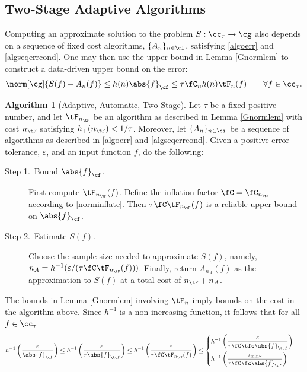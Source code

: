 \documentclass[]{elsarticle}
\theoremstyle{definition}
\newtheorem{algo}{Algorithm}
\theoremstyle{remark}
\newcommand{\Fnorm}[1]{\abs{#1}_{\cf}}
\newcommand{\Ftnorm}[1]{\abs{#1}_{\tcf}}
\begin{document}
\subsection{Two-Stage Adaptive Algorithms} \label{twostagesec}

Computing an approximate solution to the problem $S: \cc_{\tau} \to \cg$ also depends on a sequence of fixed cost algorithms, $\{A_n\}_{n \in \ci}$, satisfying \eqref{algoerr} and \eqref{algseqerrcond}.  One may then use the upper bound in Lemma \ref{Gnormlem} to construct a data-driven upper bound on the error:
\begin{equation} \label{Anerrbound}
\norm[\cg]{S(f) -  A_n(f)} \le h(n)\Fnorm{f} \le \tau  \fC_n h(n)\tF_n(f) \qquad \forall f \in \cc_{\tau}.
\end{equation}

\begin{algo}[Adaptive, Automatic, Two-Stage] \label{twostagedetalgo} Let $\tau$ be a fixed positive number, and let $\tF_{n_{\tF}}$ be an algorithm as described in Lemma \ref{Gnormlem} with cost $n_{\tF}$ satisfying $h_{+}(n_{\tF}) < 1/\tau$.
Moreover, let  $\{A_n\}_{n \in \ci}$ be a sequence of algorithms as described in \eqref{algoerr} and \eqref{algseqerrcond}.  Given  a positive error tolerance, $\varepsilon$, and  an input function $f$, do the following:

\begin{description} 

\item[Step 1.\ Bound {$\Fnorm{f}$}.] First compute $\tF_{n_{\tF}}(f)$.  Define the inflation factor $\fC=\fC_{n_{\tF}}$ according to \eqref{norminflate}.
Then $\tau \fC \tF_{n_{\tF}}(f)$ is a reliable upper bound on $\Fnorm{f}$.  

\item [Step 2.\ Estimate {$S(f)$}.] Choose the sample size needed to approximate $S(f)$, namely, $n_A=h^{-1}(\varepsilon/(\tau\fC \tF_{n_{\tF}}(f)))$.  Finally, return $A_{n_A}(f)$ as the approximation to $S(f)$ at a total cost of $n_{\tF}+n_A$. 
\end{description}
\end{algo}

The bounds in Lemma \ref{Gnormlem} involving $\tF_n$ imply bounds on the cost in the algorithm above.  Since $h^{-1}$ is a non-increasing function, it follows that for all $f \in \cc_{\tau}$
\begin{equation*}
h^{-1}\left(\frac{\varepsilon}{\Fnorm{f}}\right) \le  h^{-1}\left(\frac{\varepsilon}{\tau\Ftnorm{f}}\right)  \le h^{-1}\left(\frac{\varepsilon}{\tau \fC \tF_{n_{\tF}}(f)}\right) \le 
\begin{cases} \displaystyle  h^{-1}\left(\frac{\varepsilon}{\tau \fC \tfc \Ftnorm{f}}\right) \\[2ex]
\displaystyle  h^{-1}\left(\frac{\tau_{\min} \varepsilon}{\tau \fC \fc \Fnorm{f}}\right)\end{cases}.
\end{equation*}
\end{document}
